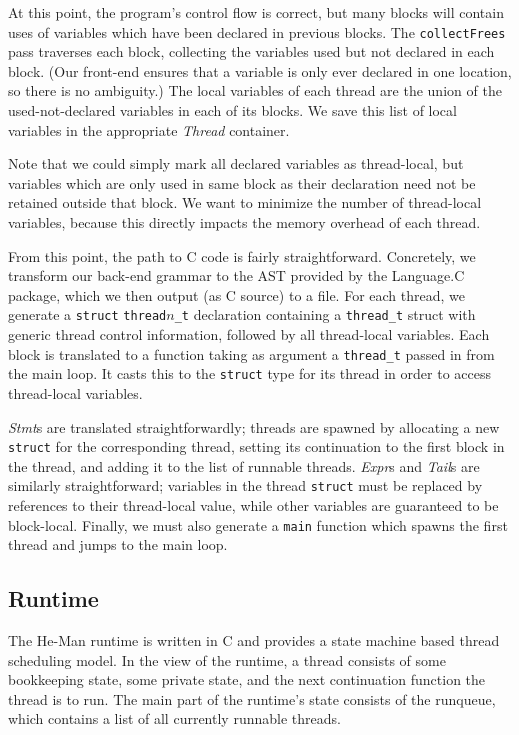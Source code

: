 \documentclass[preprint,10pt]{sigplanconf}
\renewcommand{\t}{\texttt}
\renewcommand{\i}{\textit}
\begin{document}
At this point, the program's control flow is correct, but many blocks will
contain uses of variables which have been declared in previous blocks. The
\t{collectFrees} pass traverses each block, collecting the variables used but
not declared in each block. (Our front-end ensures that a variable is only ever
declared in one location, so there is no ambiguity.) The local variables of each
thread are the union of the used-not-declared variables in each of its blocks.
We save this list of local variables in the appropriate \i{Thread} container.

Note that we could simply mark all declared variables as thread-local, but
variables which are only used in same block as their declaration need not be
retained outside that block. We want to minimize the number of thread-local
variables, because this directly impacts the memory overhead of each thread.

From this point, the path to C code is fairly straightforward. Concretely, we
transform our back-end grammar to the AST provided by the Language.C package,
which we then output (as C source) to a file. For each thread, we generate a
\t{struct} \t{thread$n$\_t} declaration containing a \t{thread\_t} struct with
generic thread control information, followed by all thread-local variables. Each
block is translated to a function taking as argument a \t{thread\_t} passed in
from the main loop. It casts this to the \t{struct} type for its thread in order
to access thread-local variables.

\i{Stmt}s are translated straightforwardly; threads are spawned by allocating a
new \t{struct} for the corresponding thread, setting its continuation to the
first block in the thread, and adding it to the list of runnable threads.
\i{Expr}s and \i{Tail}s are similarly straightforward; variables in the thread
\t{struct} must be replaced by references to their thread-local value, while
other variables are guaranteed to be block-local. Finally, we must also generate
a \t{main} function which spawns the first thread and jumps to the main loop.
  
\subsection{Runtime}

The He-Man runtime is written in C and provides a state machine based
thread scheduling model. In the view of the runtime, a thread consists
of some bookkeeping state, some private state, and the next
continuation function the thread is to run. The main part of the
runtime's state consists of the runqueue, which contains a list of all
currently runnable threads.
\end{document}
